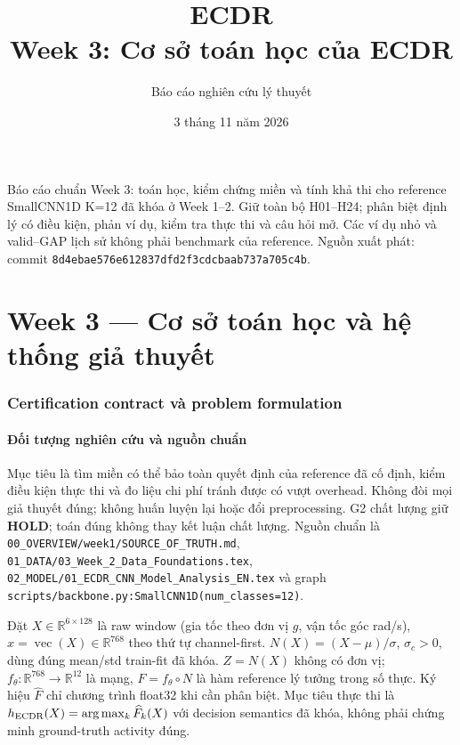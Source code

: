 \documentclass[11pt,a4paper]{article}
\newcommand{\R}{\mathbb R}
\newcommand{\code}[1]{{\small\ttfamily\nolinkurl{#1}}}
\newcommand{\vecop}{\operatorname{vec}}
\theoremstyle{remark}
\begin{document}
\title{\textcolor{ink}{ECDR}\\[5pt]\Large Week 3: Cơ sở toán học của ECDR}
\author{Báo cáo nghiên cứu lý thuyết}
\date{3 tháng 11 năm 2026}
\maketitle
\noindent Báo cáo chuẩn Week 3: toán học, kiểm chứng miền và tính khả thi cho
reference SmallCNN1D K=12 đã khóa ở Week 1--2. Giữ toàn bộ H01--H24;
phân biệt định lý có điều kiện, phản ví dụ, kiểm tra thực thi và câu hỏi mở.
Các ví dụ nhỏ và valid--GAP lịch sử không phải benchmark của reference.
Nguồn xuất phát: commit \code{8d4ebae576e612837dfd2f3cdcbaab737a705c4b}.
\tableofcontents
\clearpage
\part{Week 3 --- Cơ sở toán học và hệ thống giả thuyết}
\section{Certification contract và problem formulation}
\subsection{Đối tượng nghiên cứu và nguồn chuẩn}
Mục tiêu là tìm miền có thể bảo toàn quyết định của reference đã cố định,
kiểm điều kiện thực thi và đo liệu chi phí tránh được có vượt overhead.
Không đòi mọi giả thuyết đúng; không huấn luyện lại hoặc đổi preprocessing.
G2 chất lượng giữ \textbf{HOLD}; toán đúng không thay kết luận chất lượng.
Nguồn chuẩn là \code{00_OVERVIEW/week1/SOURCE_OF_TRUTH.md},
\code{01_DATA/03_Week_2_Data_Foundations.tex},
\code{02_MODEL/01_ECDR_CNN_Model_Analysis_EN.tex} và graph
\code{scripts/backbone.py:SmallCNN1D(num_classes=12)}.

Đặt $X\in\R^{6\times128}$ là raw window (gia tốc theo đơn vị $g$, vận tốc
 góc rad/s), $x=\vecop(X)\in\R^{768}$ theo thứ tự channel-first.
$N(X)=(X-\mu)/\sigma$, $\sigma_c>0$, dùng đúng mean/std train-fit đã khóa.
$Z=N(X)$ không có đơn vị; $f_\theta:\R^{768}\to\R^{12}$ là mạng,
$F=f_\theta\circ N$ là hàm reference lý tưởng trong số thực. Ký hiệu
$\widehat F$ chỉ chương trình float32 khi cần phân biệt. Mục tiêu thực thi là
$h_{\rm ECDR}(X)=\arg\max_k\widehat F_k(X)$ với decision semantics đã khóa,
không phải chứng minh ground-truth activity đúng.
\end{document}
